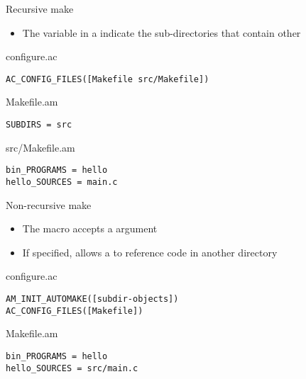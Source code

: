 \begin{frame}[fragile]{Recursive make}

  \begin{itemize}
  \item The  variable in a  indicate
    the sub-directories that contain other 
  \end{itemize}

  \begin{block}{configure.ac}
\begin{verbatim}
AC_CONFIG_FILES([Makefile src/Makefile])
\end{verbatim}
  \end{block}

  \begin{block}{Makefile.am}
\begin{verbatim}
SUBDIRS = src
\end{verbatim}
  \end{block}

  \begin{block}{src/Makefile.am}
\begin{verbatim}
bin_PROGRAMS = hello
hello_SOURCES = main.c
\end{verbatim}
  \end{block}
\end{frame}

\begin{frame}[fragile]{Non-recursive make}

  \begin{itemize}
  \item The  macro accepts a
     argument
  \item If specified, allows a  to reference code in
    another directory
  \end{itemize}

\begin{block}{configure.ac}
\begin{verbatim}
AM_INIT_AUTOMAKE([subdir-objects])
AC_CONFIG_FILES([Makefile])
\end{verbatim}
\end{block}

\begin{block}{Makefile.am}
\begin{verbatim}
bin_PROGRAMS = hello
hello_SOURCES = src/main.c
\end{verbatim}
\end{block}

\end{frame}

